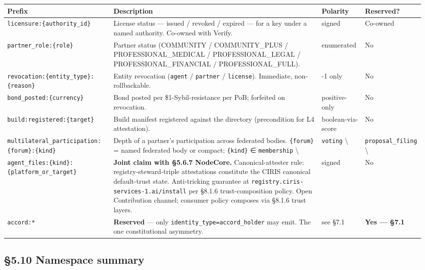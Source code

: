 \documentclass[10pt]{article}
\begin{document}
{\scriptsize
\begin{longtable}{|p{4.0cm}|p{4.0cm}|p{4.0cm}|p{4.0cm}|}\hline
\textbf{Prefix} & \textbf{Description} & \textbf{Polarity} & \textbf{Reserved?} \\ \hline\endhead
\texttt{licensure:\{authority\_id\}} & License status — issued / revoked / expired — for a key under a named authority. Co-owned with Verify. & signed & Co-owned \\ \hline
\texttt{partner\_role:\{role\}} & Partner status (COMMUNITY / COMMUNITY\_PLUS / PROFESSIONAL\_MEDICAL / PROFESSIONAL\_LEGAL / PROFESSIONAL\_FINANCIAL / PROFESSIONAL\_FULL). & enumerated & No \\ \hline
\texttt{revocation:\{entity\_type\}:\{reason\}} & Entity revocation (\texttt{agent} / \texttt{partner} / \texttt{license}). Immediate, non-rollbackable. & -1 only & No \\ \hline
\texttt{bond\_posted:\{currency\}} & Bond posted per \$1-Sybil-resistance per PoB; forfeited on revocation. & positive-only & No \\ \hline
\texttt{build:registered:\{target\}} & Build manifest registered against the directory (precondition for L4 attestation). & boolean-via-score & No \\ \hline
\texttt{multilateral\_participation:\{forum\}:\{kind\}} & Depth of a partner's participation across federated bodies. \texttt{\{forum\}} = named federated body or compact; \texttt{\{kind\}} ∈ \texttt{membership} \textbackslash{} & \texttt{voting} \textbackslash{} & \texttt{proposal\_filing} \textbackslash{} \\ \hline
\texttt{agent\_files:\{kind\}:\{platform\_or\_target\}} & \textbf{Joint claim with §5.6.7 NodeCore.} Canonical-attester rule: registry-steward-triple attestations constitute the CIRIS canonical default-trust state. Anti-tricking guarantee at \texttt{registry.ciris-services-1.ai/install} per §8.1.6 trust-composition policy. Open Contribution channel; consumer policy composes via §8.1.6 trust layers. & signed & No \\ \hline
\texttt{accord:*} & \textbf{Reserved} — only \texttt{identity\_type=accord\_holder} may emit. The one constitutional asymmetry. & see §7.1 & \textbf{Yes — §7.1} \\ \hline
\end{longtable}}


\subsection*{§5.10 Namespace summary}
\end{document}
